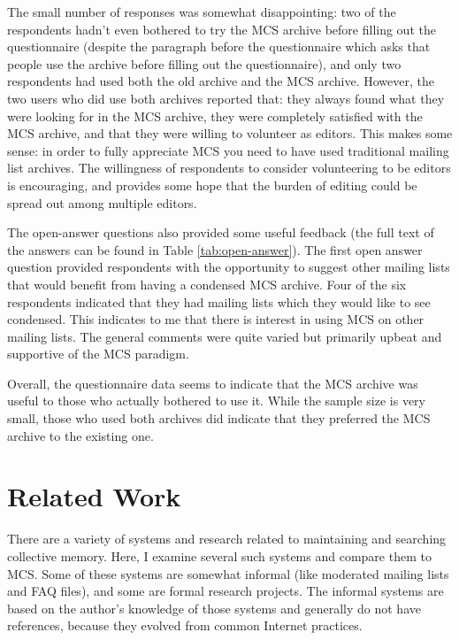 The small number of responses was somewhat disappointing: two of the
respondents hadn't even bothered to try the MCS archive before filling out the
questionnaire (despite the paragraph before the questionnaire which asks that
people use the archive before filling out the questionnaire), and only two
respondents had used both the old archive and the MCS archive. However, the two
users who did use both archives reported that: they always found what they were
looking for in the MCS archive, they were completely satisfied with the MCS
archive, and that they were willing to volunteer as editors. This makes some
sense: in order to fully appreciate MCS you need to have used traditional
mailing list archives. The willingness of respondents to consider volunteering
to be editors is encouraging, and provides some hope that the burden of editing
could be spread out among multiple editors.

The open-answer questions also provided some useful feedback (the full text of
the answers can be found in Table \ref{tab:open-answer}). The first open answer
question provided respondents with the opportunity to suggest other mailing
lists that would benefit from having a condensed MCS archive. Four of the six
respondents indicated that they had mailing lists which they would like to see
condensed. This indicates to me that there is interest in using MCS on other
mailing lists. The general comments were quite varied but primarily upbeat and
supportive of the MCS paradigm.

Overall, the questionnaire data seems to indicate that the MCS archive was
useful to those who actually bothered to use it. While the sample size is very
small, those who used both archives did indicate that they preferred the MCS
archive to the existing one.


\chapter{Related Work}
\label{cha:related-work}
There are a variety of systems and research related to maintaining and
searching collective memory. Here, I examine several such systems and compare
them to MCS. Some of these systems are somewhat informal (like moderated
mailing lists and FAQ files), and some are formal research projects. The
informal systems are based on the author's knowledge of those systems and
generally do not have references, because they evolved from common Internet
practices.

